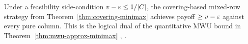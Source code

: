 \begin{thm}
\label{thm:finite-approx-minimax}
  \leanok
Under a feasibility side-condition $v - \varepsilon \le 1/|C|$, the
covering-based mixed-row strategy from
Theorem~\ref{thm:covering-minimax} achieves payoff $\ge v - \varepsilon$
against every pure column. This is the logical dual of the
quantitative MWU bound in
Theorem~\ref{thm:mwu-approx-minimax}
\cite{freund1999games}, \cite[\S3.1]{arora2012multiplicative}.
\end{thm}
